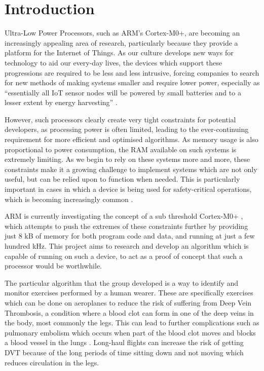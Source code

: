 \chapter{Introduction}

Ultra-Low Power Processors, such as ARM's Cortex-M0+, are becoming an increasingly appealing area of research, particularly because they provide a platform for the Internet of Things. As our culture develops new ways for technology to aid our every-day lives, the devices which support these progressions are required to be less and less intrusive, forcing companies to search for new methods of making systems smaller and require lower power, especially as ``essentially all IoT sensor nodes will be powered by small batteries and to a lesser extent by energy harvesting'' \cite{iot_power}.

However, such processors clearly create very tight constraints for potential developers, as processing power is often limited, leading to the ever-continuing requirement for more efficient and optimised algorithms. As memory usage is also proportional to power consumption, the RAM available on such systems is extremely limiting. As we begin to rely on these systems more and more, these constraints make it a growing challenge to implement systems which are not only useful, but can be relied upon to function when needed. This is particularly important in cases in which a device is being used for safety-critical operations, which is becoming increasingly common \cite{iot_saftey} \cite{iot_saftey2}.

ARM is currently investigating the concept of a sub threshold Cortex-M0+ \cite{arm_sub}, which attempts to push the extremes of these constraints further by providing just 8 kB of memory for both program code and data, and running at just a few hundred kHz. This project aims to research and develop an algorithm which is capable of running on such a device, to act as a proof of concept that such a processor would be worthwhile.


The particular algorithm that the group developed is a way to identify and monitor exercises performed by a human wearer. These are specifically exercises which can be done on aeroplanes to reduce the risk of suffering from Deep Vein Thrombosis, a condition where a blood clot can form in one of the deep veins in the body, most commonly the legs. This can lead to further complications such as pulmonary embolism which occurs when part of the blood clot moves and blocks a blood vessel in the lungs \cite{dvt}. Long-haul flights can increase the risk of getting DVT because of the long periods of time sitting down and not moving which reduces circulation in the legs.

